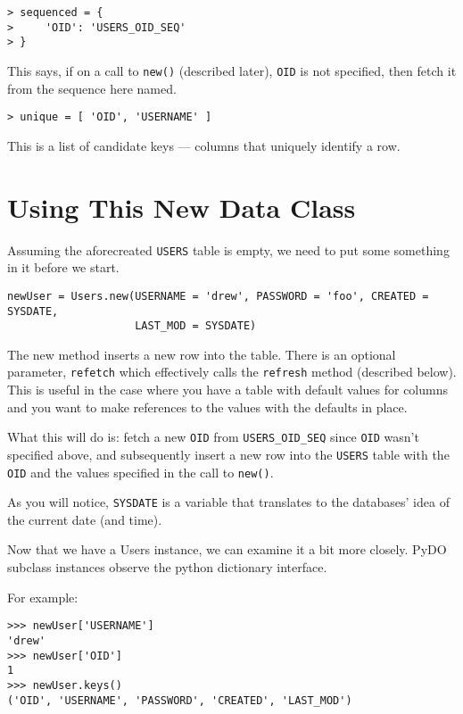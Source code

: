 \documentclass[titlepage]{manual}
\begin{document}
\begin{verbatim}
> sequenced = {
>     'OID': 'USERS_OID_SEQ'
> }
\end{verbatim}

This says, if on a call to \texttt{new()} (described later),
\texttt{OID} is not specified, then fetch it from the sequence here
named.

\begin{verbatim}
> unique = [ 'OID', 'USERNAME' ]
\end{verbatim}

This is a list of candidate keys --- columns that uniquely identify a
row.  

\section{Using This New Data Class}
Assuming the aforecreated \texttt{USERS} table is empty, we need to
put some something in it before we start.

\begin{verbatim}
newUser = Users.new(USERNAME = 'drew', PASSWORD = 'foo', CREATED = SYSDATE,
                    LAST_MOD = SYSDATE)
\end{verbatim}

The new method inserts a new row into the table.  There is an optional
parameter, \texttt{refetch} which effectively calls the
\texttt{refresh} method (described below).  This is useful in the case
where you have a table with default values for columns and you want to
make references to the values with the defaults in place.

What this will do is: fetch a new \texttt{OID} from
\texttt{USERS_OID_SEQ} since \texttt{OID} wasn't specified above, and
subsequently insert a new row into the \texttt{USERS} table with the
\texttt{OID} and the values specified in the call to \texttt{new()}.

As you will notice, \texttt{SYSDATE} is a variable that translates to
the databases' idea of the current date (and time).


Now that we have a Users instance, we can examine it a bit more
closely.  PyDO subclass instances observe the python dictionary
interface.

For example:

\begin{verbatim}
>>> newUser['USERNAME']
'drew'
>>> newUser['OID']
1
>>> newUser.keys()
('OID', 'USERNAME', 'PASSWORD', 'CREATED', 'LAST_MOD')
\end{verbatim}
\end{document}
